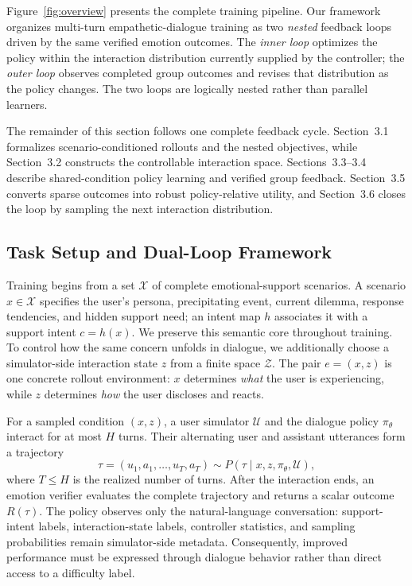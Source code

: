 \documentclass[letterpaper]{article}
\begin{document}
Figure~\ref{fig:overview} presents the complete training pipeline. Our framework organizes multi-turn empathetic-dialogue training as two \emph{nested} feedback loops driven by the same verified emotion outcomes. The \emph{inner loop} optimizes the policy within the interaction distribution currently supplied by the controller; the \emph{outer loop} observes completed group outcomes and revises that distribution as the policy changes. The two loops are logically nested rather than parallel learners.

The remainder of this section follows one complete feedback cycle. Section~3.1 formalizes scenario-conditioned rollouts and the nested objectives, while Section~3.2 constructs the controllable interaction space. Sections~3.3--3.4 describe shared-condition policy learning and verified group feedback. Section~3.5 converts sparse outcomes into robust policy-relative utility, and Section~3.6 closes the loop by sampling the next interaction distribution.

\subsection{Task Setup and Dual-Loop Framework}
Training begins from a set $\mathcal X$ of complete emotional-support scenarios. A scenario $x\in\mathcal X$ specifies the user's persona, precipitating event, current dilemma, response tendencies, and hidden support need; an intent map $h$ associates it with a support intent $c=h(x)$. We preserve this semantic core throughout training. To control how the same concern unfolds in dialogue, we additionally choose a simulator-side interaction state $z$ from a finite space $\mathcal Z$. The pair $e=(x,z)$ is one concrete rollout environment: $x$ determines \emph{what} the user is experiencing, while $z$ determines \emph{how} the user discloses and reacts.

For a sampled condition $(x,z)$, a user simulator $\mathcal U$ and the dialogue policy $\pi_\theta$ interact for at most $H$ turns. Their alternating user and assistant utterances form a trajectory
\[
\tau=(u_1,a_1,\ldots,u_T,a_T)
\sim P(\tau\mid x,z,\pi_\theta,\mathcal U),
\]
where $T\le H$ is the realized number of turns. After the interaction ends, an emotion verifier evaluates the complete trajectory and returns a scalar outcome $R(\tau)$. The policy observes only the natural-language conversation: support-intent labels, interaction-state labels, controller statistics, and sampling probabilities remain simulator-side metadata. Consequently, improved performance must be expressed through dialogue behavior rather than direct access to a difficulty label.
\end{document}
